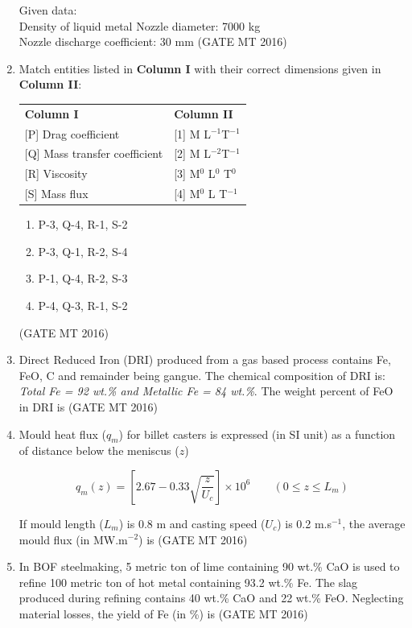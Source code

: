 \documentclass[journal, 11pt, onecolumn]{IEEEtran}
\theoremstyle{remark}
\begin{document}
\begin{enumerate}
    Given data:\\
    Density of liquid metal Nozzle diameter: 7000 kg \\
    Nozzle discharge coefficient: 30 mm
\hfill(GATE MT 2016)

\item Match entities listed in \textbf{Column I} with their correct dimensions given in \textbf{Column II}:

\begin{tabular}{ll}
\textbf{Column I} & \textbf{Column II} \\
{[P]} Drag coefficient & {[1]} M L$^{-1}$T$^{-1}$ \\
{[Q]} Mass transfer coefficient & {[2]} M L$^{-2}$T$^{-1}$ \\
{[R]} Viscosity & {[3]} M$^0$ L$^0$ T$^0$ \\
{[S]} Mass flux & {[4]} M$^0$ L T$^{-1}$ \\
\end{tabular}

\begin{enumerate}
\item P-3, Q-4, R-1, S-2
\item P-3, Q-1, R-2, S-4
\item P-1, Q-4, R-2, S-3
\item P-4, Q-3, R-1, S-2
\end{enumerate}
\hfill(GATE MT 2016)

\item Direct Reduced Iron (DRI) produced from a gas based process contains Fe, FeO, C and remainder being gangue. The chemical composition of DRI is: \textit{Total Fe = 92 wt.\% and Metallic Fe = 84 wt.\%}. The weight percent of FeO in DRI is 
\hfill(GATE MT 2016)

\item Mould heat flux ($q_m$) for billet casters is expressed (in SI unit) as a function of distance below the meniscus ($z$)

$$q_m(z) = \left[ 2.67 - 0.33 \sqrt{\frac{z}{U_c}} \right] \times 10^6 \qquad (0 \leq z \leq L_m)$$

If mould length ($L_m$) is 0.8 m and casting speed ($U_c$) is 0.2 m.s$^{-1}$, the average mould flux (in MW.m$^{-2}$) is 
\hfill(GATE MT 2016)

\item In BOF steelmaking, 5 metric ton of lime containing 90 wt.\% CaO is used to refine 100 metric ton of hot metal containing 93.2 wt.\% Fe. The slag produced during refining contains 40 wt.\% CaO and 22 wt.\% FeO. Neglecting material losses, the yield of Fe (in \%) is
\hfill(GATE MT 2016)


\end{enumerate}
\end{document}
